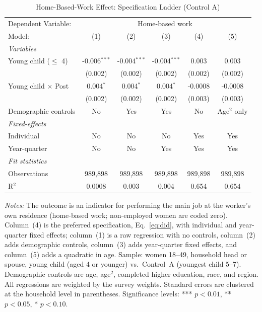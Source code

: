 
\begin{table}[H]
   \caption{\label{tab:did_firststage} Home-Based-Work Effect: Specification Ladder (Control A)}
   \centering
\small\setlength{\tabcolsep}{4pt}
   \begin{tabular}{lccccc}
      \toprule
      Dependent Variable: & \multicolumn{5}{c}{Home-based work}\\
      Model:                     & (1)            & (2)            & (3)            & (4)     & (5)\\  
      \midrule
      \emph{Variables}\\
      Young child ($\leq$ 4)     & -0.006$^{***}$ & -0.004$^{***}$ & -0.004$^{***}$ & 0.003   & 0.003\\   
                                 & (0.002)        & (0.002)        & (0.002)        & (0.002) & (0.002)\\   
\addlinespace[2pt]
      Young child $\times$ Post  & 0.004$^{*}$    & 0.004$^{*}$    & 0.004$^{*}$    & -0.0008 & -0.0008\\   
                                 & (0.002)        & (0.002)        & (0.002)        & (0.003) & (0.003)\\   
\addlinespace[2pt]
      Demographic controls       & No             & Yes            & Yes            & No      & Age$^2$ only\\  
      \midrule
      \emph{Fixed-effects}\\
      Individual & No & No & No & Yes & Yes\\
      Year-quarter & No & No & Yes & Yes & Yes\\
      \midrule
      \emph{Fit statistics}\\
      Observations               & 989,898        & 989,898        & 989,898        & 989,898 & 989,898\\  
      R$^2$                      & 0.0008         & 0.003          & 0.004          & 0.654   & 0.654\\  
\bottomrule
   \end{tabular}
   
   \par \raggedright 
   \footnotesize\textit{Notes:} The outcome is an indicator for performing the main job at the worker's own residence (home-based work; non-employed women are coded zero). Column~(4) is the preferred specification, Eq.~\eqref{eq:did}, with individual and year-quarter fixed effects; column~(1) is a raw regression with no controls, column~(2) adds demographic controls, column~(3) adds year-quarter fixed effects, and column~(5) adds a quadratic in age. Sample: women 18--49, household head or spouse, young child (aged 4 or younger) vs.\ Control~A (youngest child 5--7). Demographic controls are age, age$^2$, completed higher education, race, and region. All regressions are weighted by the survey weights. Standard errors are clustered at the household level in parentheses. Significance levels: *** $p<0.01$, ** $p<0.05$, * $p<0.10$.
\end{table}


